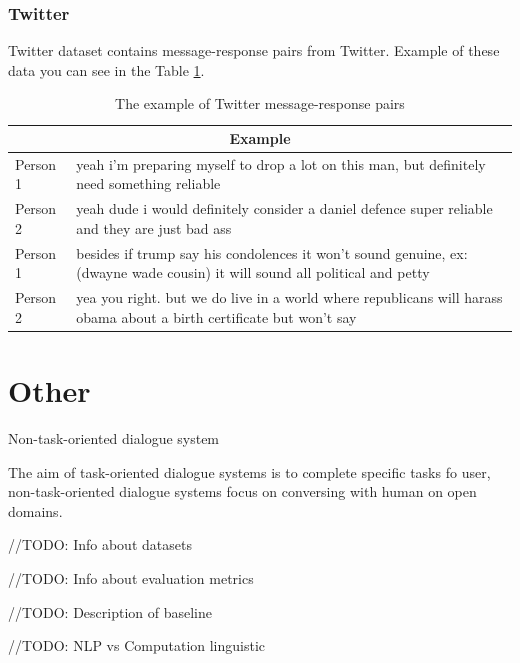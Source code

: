 \subsection{Twitter}
Twitter dataset contains message-response pairs from Twitter. Example of these data you can see in the Table \ref{tab:twitter_chat}. 

\begin{table}[t]
\centering
 \begin{tabular}{|p{2cm}|p{8cm}|} 
 \hline
 \multicolumn{2}{|c|}{Example} \\
 \hline
 Person 1 & yeah i'm preparing myself to drop a lot on this man, but definitely need something reliable \\ 
 \hline
 Person 2 & yeah dude i would definitely consider a daniel defence super reliable and they are just bad ass \\
 \hline
 Person 1 & besides if trump say his condolences it won't sound genuine, ex: (dwayne wade cousin) it will sound all political and petty \\
 \hline
 Person 2 & yea you right. but we do live in a world where republicans will harass obama about a birth certificate but won't say \\
 \hline
 \end{tabular}
 \caption{The example of Twitter message-response pairs}
\label{tab:twitter_chat}
\end{table}

\chapter{Other}

Non-task-oriented dialogue system

The aim of task-oriented dialogue systems is to complete specific tasks fo user, non-task-oriented dialogue systems focus on conversing with human on open domains. 

//TODO: Info about datasets

//TODO: Info about evaluation metrics

//TODO: Description of baseline

//TODO: NLP vs Computation linguistic

